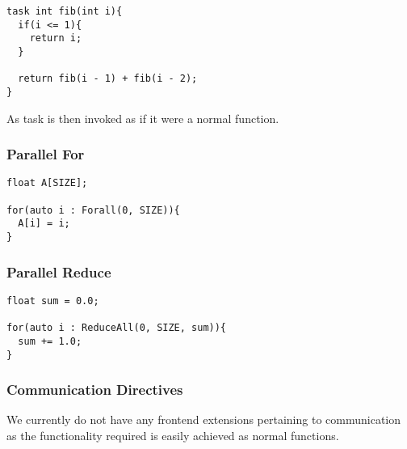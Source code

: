 \documentclass[12pt]{article}
\begin{document}
\begin{lstlisting}[style=C++]
task int fib(int i){
  if(i <= 1){
    return i;
  }

  return fib(i - 1) + fib(i - 2);
}
\end{lstlisting}

As task is then invoked as if it were a normal function.

\subsubsection{Parallel For}

\begin{lstlisting}[style=C++]
float A[SIZE];

for(auto i : Forall(0, SIZE)){
  A[i] = i;
}
\end{lstlisting}

\subsubsection{Parallel Reduce}

\begin{lstlisting}[style=C++]
float sum = 0.0;

for(auto i : ReduceAll(0, SIZE, sum)){
  sum += 1.0;
}
\end{lstlisting}

\subsubsection{Communication Directives}

We currently do not have any frontend extensions pertaining to communication as the functionality required is easily achieved as normal functions.
\end{document}
